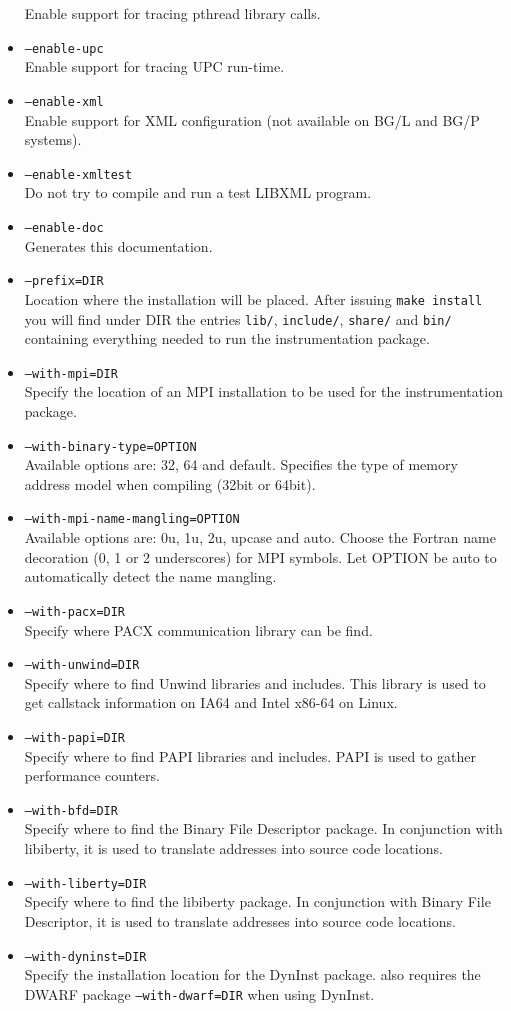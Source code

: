 \begin{itemize}
	Enable support for tracing pthread library calls.
	\item {\tt --enable-upc} \\
	Enable support for tracing UPC run-time.
	\item {\tt --enable-xml} \\
	Enable support for XML configuration (not available on BG/L and BG/P systems).
	\item {\tt --enable-xmltest} \\
	Do not try to compile and run a test LIBXML program.
	\item {\tt --enable-doc} \\
	Generates this documentation.
	\item {\tt --prefix=DIR} \\
	Location where the installation will be placed. After issuing {\tt make install} you will find under DIR the entries {\tt lib/}, {\tt include/}, {\tt share/} and {\tt bin/} containing everything needed to run the instrumentation package.
	\item {\tt --with-mpi=DIR} \\
	Specify the location of an MPI installation to be used for the instrumentation package.
	\item {\tt --with-binary-type=OPTION} \\
	Available options are: 32, 64 and default. Specifies the type of memory address model when compiling (32bit or 64bit).
	\item {\tt --with-mpi-name-mangling=OPTION} \\
	Available options are: 0u, 1u, 2u, upcase and auto. Choose the Fortran name decoration (0, 1 or 2 underscores) for MPI symbols. Let OPTION be auto to automatically detect the name mangling.
	\item {\tt --with-pacx=DIR} \\
	Specify where PACX communication library can be find.
	\item {\tt --with-unwind=DIR} \\
	Specify where to find Unwind libraries and includes. This library is used to get callstack information on IA64 and Intel x86-64 on Linux.
	\item {\tt --with-papi=DIR} \\
	Specify where to find PAPI libraries and includes. PAPI is used to gather performance counters.
	\item {\tt --with-bfd=DIR} \\
	Specify where to find the Binary File Descriptor package. In conjunction with libiberty, it is used to translate addresses into source code locations.
	\item {\tt --with-liberty=DIR} \\
	Specify where to find the libiberty package. In conjunction with Binary File Descriptor, it is used to translate addresses into source code locations.
  \item {\tt --with-dyninst=DIR} \\
  Specify the installation location for the DynInst package. \TRACE also requires the DWARF package {\tt --with-dwarf=DIR} when using DynInst.
\end{itemize}


